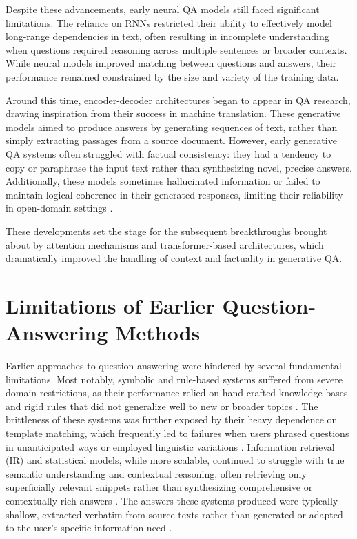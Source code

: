 \begin{spacing}{1.5}
Despite these advancements, early neural QA models still faced significant limitations. The reliance on RNNs restricted their ability to effectively model long-range dependencies in text, often resulting in incomplete understanding when questions required reasoning across multiple sentences or broader contexts. While neural models improved matching between questions and answers, their performance remained constrained by the size and variety of the training data.

Around this time, encoder-decoder architectures began to appear in QA research, drawing inspiration from their success in machine translation. These generative models aimed to produce answers by generating sequences of text, rather than simply extracting passages from a source document. However, early generative QA systems often struggled with factual consistency: they had a tendency to copy or paraphrase the input text rather than synthesizing novel, precise answers. Additionally, these models sometimes hallucinated information or failed to maintain logical coherence in their generated responses, limiting their reliability in open-domain settings \citep{caballero_brief_2021}.

These developments set the stage for the subsequent breakthroughs brought about by attention mechanisms and transformer-based architectures, which dramatically improved the handling of context and factuality in generative QA.

\section{Limitations of Earlier Question-Answering Methods}
Earlier approaches to question answering were hindered by several fundamental limitations. Most notably, symbolic and rule-based systems suffered from severe domain restrictions, as their performance relied on hand-crafted knowledge bases and rigid rules that did not generalize well to new or broader topics \citep{alqifari_question_2019}. The brittleness of these systems was further exposed by their heavy dependence on template matching, which frequently led to failures when users phrased questions in unanticipated ways or employed linguistic variations \citep{hirschman_natural_2001}. Information retrieval (IR) and statistical models, while more scalable, continued to struggle with true semantic understanding and contextual reasoning, often retrieving only superficially relevant snippets rather than synthesizing comprehensive or contextually rich answers \citep{alanazi_question_2021, diefenbach_core_2018}. The answers these systems produced were typically shallow, extracted verbatim from source texts rather than generated or adapted to the user’s specific information need \citep{hirschman_natural_2001,alqifari_question_2019}.


\end{spacing}
